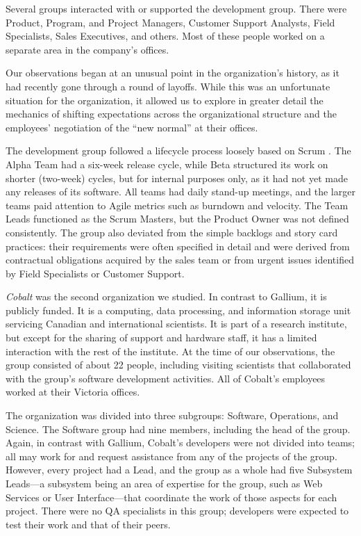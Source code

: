 \documentclass[10pt, conference, compsocconf]{IEEEtran}
\begin{document}
Several groups interacted with or supported the development group. There were Product, Program, and Project Managers, Customer Support Analysts, Field Specialists, Sales Executives, and others. Most of these people worked on a separate area in the company's offices.

Our observations began at an unusual point in the organization's history, as it had recently gone through a round of layoffs. While this was an unfortunate situation for the organization, it allowed us to explore in greater detail the mechanics of shifting expectations across the organizational structure and the employees' negotiation of the ``new normal'' at their offices.

The development group followed a lifecycle process loosely based on Scrum \cite{Schwaber2001}. The Alpha Team had a six-week release cycle, while Beta structured its work on shorter (two-week) cycles, but for internal purposes only, as it had not yet made any releases of its software. All teams had daily stand-up meetings, and the larger teams paid attention to Agile metrics such as burndown and velocity. The Team Leads functioned as the Scrum Masters, but the Product Owner was not defined consistently. The group also deviated from the simple backlogs and story card practices: their requirements were often specified in detail and were derived from contractual obligations acquired by the sales team or from urgent issues identified by Field Specialists or Customer Support.

\emph{Cobalt} was the second organization we studied. In contrast to Gallium, it is publicly funded. It is a computing, data processing, and information storage unit servicing Canadian and international scientists. It is part of a research institute, but except for the sharing of support and hardware staff, it has a limited interaction with the rest of the institute. At the time of our observations, the group consisted of about 22 people, including visiting scientists that collaborated with the group's software development activities. All of Cobalt's employees worked at their Victoria offices.

The organization was divided into three subgroups: Software, Operations, and Science. The Software group had nine members, including the head of the group. Again, in contrast with Gallium, Cobalt's developers were not divided into teams; all may work for and request assistance from any of the projects of the group. However, every project had a Lead, and the group as a whole had five Subsystem Leads---a subsystem being an area of expertise for the group, such as Web Services or User Interface---that coordinate the work of those aspects for each project. There were no QA specialists in this group; developers were expected to test their work and that of their peers.
\end{document}
